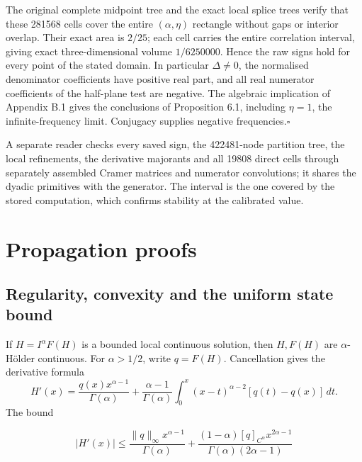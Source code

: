 \documentclass[11pt,a4paper]{article}
\newcommand{\proofend}{\hfill\(\square\)\par\addvspace{0.6\baselineskip}}
\begin{document}
The original complete midpoint tree and the exact local splice trees verify that these 281568 cells cover the entire \((\alpha,\eta)\) rectangle without gaps or interior overlap. Their exact area is \(2/25\); each cell carries the entire correlation interval, giving exact three-dimensional volume \(1/6250000\). Hence the raw signs hold for every point of the stated domain. In particular \(\Delta\ne0\), the normalised denominator coefficients have positive real part, and all real numerator coefficients of the half-plane test are negative. The algebraic implication of Appendix B.1 gives the conclusions of Proposition 6.1, including \(\eta=1\), the infinite-frequency limit. Conjugacy supplies negative frequencies.\proofend

A separate reader checks every saved sign, the 422481-node partition tree, the local refinements, the derivative majorants and all 19808 direct cells through separately assembled Cramer matrices and numerator convolutions; it shares the dyadic primitives with the generator. The interval is the one covered by the stored computation, which confirms stability at the calibrated value.

\setcounter{section}{2}\section{Propagation proofs}

\setcounter{subsection}{0}\subsection{Regularity, convexity and the uniform state bound}

If \(H=I^\alpha F(H)\) is a bounded local continuous solution, then \(H,F(H)\) are \(\alpha\)-Hölder continuous. For \(\alpha>1/2\), write \(q=F(H)\). Cancellation gives the derivative formula
\begin{equation*}\tag{C.1}
H'(x)=\frac{q(x)x^{\alpha-1}}{\Gamma(\alpha)}
 +\frac{\alpha-1}{\Gamma(\alpha)}
\int_0^x(x-t)^{\alpha-2}[q(t)-q(x)]\,dt.
\end{equation*}
The bound 

\begin{equation*}\tag{C.2}
|H'(x)|\le\frac{\|q\|_\infty x^{\alpha-1}}{\Gamma(\alpha)}+\frac{(1-\alpha)[q]_{C^\alpha}x^{2\alpha-1}}{\Gamma(\alpha)(2\alpha-1)}
\end{equation*}
\end{document}
